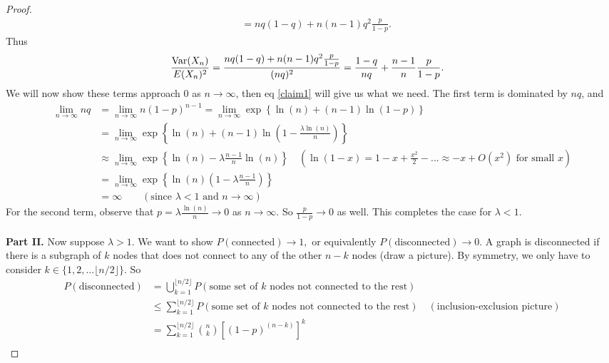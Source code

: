 \documentclass[./some_latex_template.tex]{subfiles}
\begin{document}
\begin{proof}
\begin{align*}
	&= nq(1-q) + n(n-1)q^2\frac{p}{1-p}.
\end{align*}
Thus 
\begin{align*}
	\frac{\mathop{\rm Var}\nolimits(X_n)}{E(X_n)^2} 
	&= \frac{nq(1-q) + n(n-1)q^2\frac{p}{1-p}}{(nq)^2} = \frac{1-q}{nq} + \frac{n-1}{n}\frac{p}{1-p}.
\end{align*}
We will now show these terms approach 0 as $n \rightarrow \infty$, then eq \eqref{claim1} will give us what we need.
The first term is dominated by $nq$, and
\begin{align*}
	\lim_{n \rightarrow \infty} nq 
	&= \lim_{n \rightarrow \infty} n(1-p)^{n-1} = \lim_{n \rightarrow \infty}  \exp \left\{ \ln(n) + (n-1)\ln(1 - p) \right\}\\
	&= \lim_{n \rightarrow \infty} \exp \left\{ \ln(n) + (n-1)\ln\left( 1 - \frac{\lambda \ln(n)}{n} \right) \right\}\\
	&\approx \lim_{n \rightarrow \infty} \exp \left\{ \ln(n) - \lambda\frac{n-1}{n}\ln(n) \right\} \quad (\ln(1 - x) = 1 - x + \frac{x^2}{2}- ... \approx -x + O(x^2) \text{ for small }x)\\
	&= \lim_{n \rightarrow \infty} \exp \left\{ \ln(n)\left( 1 - \lambda\frac{n-1}{n} \right) \right\}\\
	&= \infty \qquad \left(\text{since } \lambda < 1 \text{ and } n \rightarrow \infty \right)
\end{align*}
For the second term, observe that $p = \lambda \frac{\ln(n)}{n} \rightarrow 0$ as $n \rightarrow \infty$. So $\frac{p}{1-p} \rightarrow 0$ as well. This completes the case for $\lambda < 1$. \\
\\
\textbf{Part II.} Now suppose $\lambda > 1$. We want to show $P(\text{connected})\rightarrow 1,$ or equivalently $P(\text{disconnected})\rightarrow 0$. A graph is disconnected if there is a subgraph of $k$ nodes that does not connect to any of the other $n - k$ nodes (draw a picture). By symmetry, we only have to consider $k \in \{1, 2, ... \lfloor n/2 \rfloor\}$.  So 
\begin{align*}
	P(\text{disconnected}) 
	&= \bigcup_{k=1}^{\lfloor n/2 \rfloor} P(\text{some set of } k \text{ nodes not connected to the rest})\\
	&\le \sum_{k=1}^{\lfloor n/2 \rfloor} P(\text{some set of } k \text{ nodes not connected to the rest}) \quad (\text{inclusion-exclusion picture})\\
	&= \sum_{k=1}^{\lfloor n/2 \rfloor} {n \choose k} \left[ (1-p)^{(n - k)} \right]^k\\

\end{align*}
\end{proof}
\end{document}
